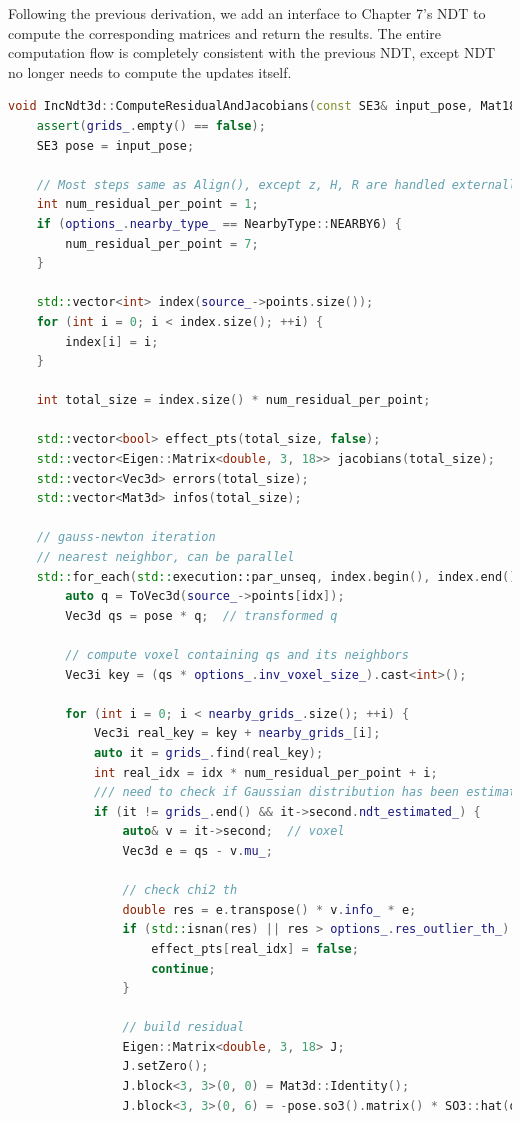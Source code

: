 Following the previous derivation, we add an interface to Chapter 7's NDT to compute the corresponding matrices and return the results. The entire computation flow is completely consistent with the previous NDT, except NDT no longer needs to compute the updates itself.

\begin{lstlisting}[language=c++,caption=src/ch7/ndt\_inc.cc]
void IncNdt3d::ComputeResidualAndJacobians(const SE3& input_pose, Mat18d& HTVH, Vec18d& HTVr) {
	assert(grids_.empty() == false);
	SE3 pose = input_pose;
	
	// Most steps same as Align(), except z, H, R are handled externally
	int num_residual_per_point = 1;
	if (options_.nearby_type_ == NearbyType::NEARBY6) {
		num_residual_per_point = 7;
	}
	
	std::vector<int> index(source_->points.size());
	for (int i = 0; i < index.size(); ++i) {
		index[i] = i;
	}
	
	int total_size = index.size() * num_residual_per_point;
	
	std::vector<bool> effect_pts(total_size, false);
	std::vector<Eigen::Matrix<double, 3, 18>> jacobians(total_size);
	std::vector<Vec3d> errors(total_size);
	std::vector<Mat3d> infos(total_size);
	
	// gauss-newton iteration
	// nearest neighbor, can be parallel
	std::for_each(std::execution::par_unseq, index.begin(), index.end(), [&](int idx) {
		auto q = ToVec3d(source_->points[idx]);
		Vec3d qs = pose * q;  // transformed q
		
		// compute voxel containing qs and its neighbors
		Vec3i key = (qs * options_.inv_voxel_size_).cast<int>();
		
		for (int i = 0; i < nearby_grids_.size(); ++i) {
			Vec3i real_key = key + nearby_grids_[i];
			auto it = grids_.find(real_key);
			int real_idx = idx * num_residual_per_point + i;
			/// need to check if Gaussian distribution has been estimated
			if (it != grids_.end() && it->second.ndt_estimated_) {
				auto& v = it->second;  // voxel
				Vec3d e = qs - v.mu_;
				
				// check chi2 th
				double res = e.transpose() * v.info_ * e;
				if (std::isnan(res) || res > options_.res_outlier_th_) {
					effect_pts[real_idx] = false;
					continue;
				}
				
				// build residual
				Eigen::Matrix<double, 3, 18> J;
				J.setZero();
				J.block<3, 3>(0, 0) = Mat3d::Identity();                   // Jacobian w.r.t. p
				J.block<3, 3>(0, 6) = -pose.so3().matrix() * SO3::hat(q);  // Jacobian w.r.t. R
				

\end{lstlisting}

